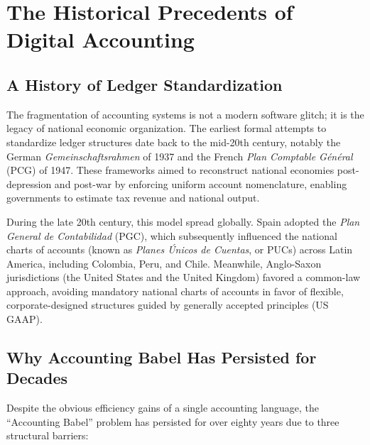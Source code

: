 \section{The Historical Precedents of Digital Accounting}
\label{sec:precedents}

\subsection{A History of Ledger Standardization}
The fragmentation of accounting systems is not a modern software glitch; it is the legacy of national economic organization. The earliest formal attempts to standardize ledger structures date back to the mid-20th century, notably the German \textit{Gemeinschaftsrahmen} of 1937 and the French \textit{Plan Comptable Général} (PCG) of 1947. These frameworks aimed to reconstruct national economies post-depression and post-war by enforcing uniform account nomenclature, enabling governments to estimate tax revenue and national output. 

During the late 20th century, this model spread globally. Spain adopted the \textit{Plan General de Contabilidad} (PGC), which subsequently influenced the national charts of accounts (known as \textit{Planes Únicos de Cuentas}, or PUCs) across Latin America, including Colombia, Peru, and Chile. Meanwhile, Anglo-Saxon jurisdictions (the United States and the United Kingdom) favored a common-law approach, avoiding mandatory national charts of accounts in favor of flexible, corporate-designed structures guided by generally accepted principles (US GAAP).

\subsection{Why Accounting Babel Has Persisted for Decades}
Despite the obvious efficiency gains of a single accounting language, the ``Accounting Babel'' problem has persisted for over eighty years due to three structural barriers:

